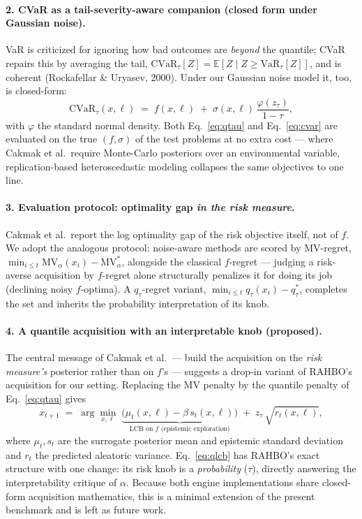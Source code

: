 \paragraph{2. CVaR as a tail-severity-aware companion (closed form under Gaussian noise).}
VaR is criticized for ignoring how bad outcomes are \emph{beyond} the quantile; CVaR repairs this
by averaging the tail, $\mathrm{CVaR}_{\tau}[Z] = \mathbb{E}\!\left[Z \mid Z \ge
\mathrm{VaR}_{\tau}[Z]\right]$, and is coherent (Rockafellar \& Uryasev, 2000). Under our
Gaussian noise model it, too, is closed-form:
\begin{equation}
  \mathrm{CVaR}_{\tau}(x,\ell) \;=\; f(x,\ell) \;+\;
  \sigma(x,\ell)\,\frac{\varphi(z_{\tau})}{1-\tau},
  \label{eq:cvar}
\end{equation}
with $\varphi$ the standard normal density. Both Eq.~\eqref{eq:qtau} and Eq.~\eqref{eq:cvar} are
evaluated on the true $(f,\sigma)$ of the test problems at no extra cost — where Cakmak et al.\
require Monte-Carlo posteriors over an environmental variable, replication-based heteroscedastic
modeling collapses the same objectives to one line.

\paragraph{3. Evaluation protocol: optimality gap \emph{in the risk measure}.}
Cakmak et al.\ report the log optimality gap of the risk objective itself, not of $f$. We adopt
the analogous protocol: noise-aware methods are scored by MV-regret,
$\min_{i\le t}\mathrm{MV}_{\alpha}(x_i) - \mathrm{MV}_{\alpha}^{*}$, alongside the classical
$f$-regret — judging a risk-averse acquisition by $f$-regret alone structurally penalizes it for
doing its job (declining noisy $f$-optima). A $q_{\tau}$-regret variant,
$\min_{i\le t} q_{\tau}(x_i) - q_{\tau}^{*}$, completes the set and inherits the probability
interpretation of its knob.

\paragraph{4. A quantile acquisition with an interpretable knob (proposed).}
The central message of Cakmak et al.\ — build the acquisition on the \emph{risk measure's}
posterior rather than on $f$'s — suggests a drop-in variant of RAHBO's acquisition for our
setting. Replacing the MV penalty by the quantile penalty of Eq.~\eqref{eq:qtau} gives
\begin{equation}
  x_{t+1} \;=\; \arg\min_{x,\ell}\;
  \underbrace{\big(\mu_t(x,\ell) - \beta\, s_t(x,\ell)\big)}_{\text{LCB on } f
  \text{ (epistemic exploration)}}
  \;+\; z_{\tau}\,\sqrt{r_t(x,\ell)},
  \label{eq:qlcb}
\end{equation}
where $\mu_t, s_t$ are the surrogate posterior mean and epistemic standard deviation and $r_t$
the predicted aleatoric variance. Eq.~\eqref{eq:qlcb} has RAHBO's exact structure with one
change: its risk knob is a \emph{probability} ($\tau$), directly answering the interpretability
critique of $\alpha$. Because both engine implementations share closed-form acquisition
mathematics, this is a minimal extension of the present benchmark and is left as future work.

